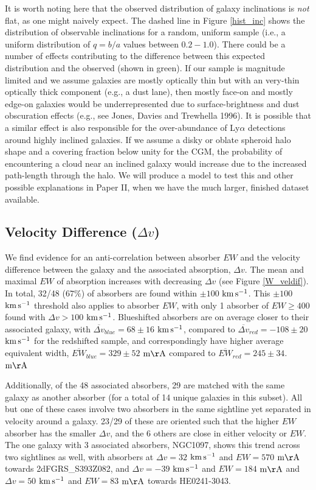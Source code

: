 \documentclass[twocolumn,tighten]{aastex6}
\begin{document}
It is worth noting here that the observed distribution of galaxy inclinations is \emph{not} flat, as one might naively expect. The dashed line in Figure \ref{hist_inc} shows the distribution of observable inclinations for a random, uniform sample (i.e., a uniform distribution of $q=b/a$ values between $0.2 - 1.0$). There could be a number of effects contributing to the difference between this expected distribution and the observed (shown in green). If our sample is magnitude limited and we assume galaxies are mostly optically thin but with an very-thin optically thick component (e.g., a dust lane), then mostly face-on and mostly edge-on galaxies would be underrepresented due to surface-brightness and dust obscuration effects (e.g., see Jones, Davies and Trewhella 1996). It is possible that a similar effect is also responsible for the over-abundance of Ly$\alpha$ detections around highly inclined galaxies. If we assume a disky or oblate spheroid halo shape and a covering fraction below unity for the CGM, the probability of encountering a cloud near an inclined galaxy would increase due to the increased path-length through the halo. We will produce a model to test this and other possible explanations in Paper II, when we have the much larger, finished dataset available.


\subsection{Velocity Difference \rm($\Delta v$\rm)}

We find evidence for an anti-correlation between absorber $EW$ and the velocity difference between the galaxy and the associated absorption, $\Delta v$. The mean and maximal $EW$ of absorption increases with decreasing $\Delta v$ (see Figure \ref{W_veldif}). In total, 32/48 ($67\%$) of absorbers are found within $\pm100$ $\rm km\, s^{-1}$. This $\pm100$ $\rm km\, s^{-1}$ threshold also applies to absorber $EW$, with only 1 absorber of $EW \geq 400$ found with $\Delta v > 100$ $\rm km\, s^{-1}$. Blueshifted absorbers are on average closer to their associated galaxy, with $\overline{\Delta v}_{blue} = 68\pm16$ $\rm km\, s^{-1}$, compared to $\overline{\Delta v}_{red}=-108\pm20$ $\rm km\, s^{-1}$ for the redshifted sample, and correspondingly have higher average equivalent width, $\overline{EW}_{blue}=329\pm52$ $\rm m\AA$ compared to $\overline{EW}_{red}=245\pm34$. $\rm m\AA$

Additionally, of the 48 associated absorbers, 29 are matched with the same galaxy as another absorber (for a total of 14 unique galaxies in this subset). All but one of these cases involve two absorbers in the same sightline yet separated in velocity around a galaxy. 23/29 of these are oriented such that the higher $EW$ absorber has the smaller $\Delta v$, and the 6 others are close in either velocity or $EW$. The one galaxy with 3 associated absorbers, NGC1097, shows this trend across two sightlines as well, with absorbers at $\Delta v = 32$ $\rm km\, s^{-1}$ and $EW = 570$ $\rm m\AA$ towards 2dFGRS\_S393Z082, and $\Delta v = -39$ $\rm km\, s^{-1}$ and $EW = 184$ $\rm m\AA$ and $\Delta v = 50$ $\rm km\, s^{-1}$ and $EW = 83$ $\rm m\AA$ towards HE0241-3043.
\end{document}

